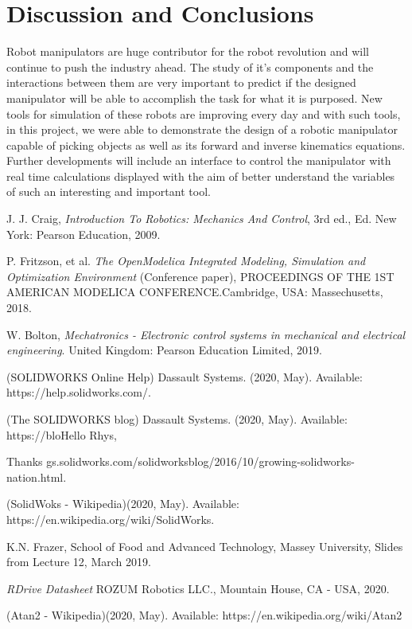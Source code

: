 \documentclass[transmag]{IEEEtran}
\begin{document}
\section{Discussion and Conclusions}

Robot manipulators are huge contributor for the robot revolution and will continue to push the industry ahead. The study of it's components and the interactions between them are very important to predict if the designed manipulator will be able to accomplish the task for what it is purposed. New tools for simulation of these robots are improving every day and with such tools, in this project, we were able to demonstrate the design of a robotic manipulator capable of picking objects as well as its forward and inverse kinematics equations. Further developments will include an interface to control the manipulator with real time calculations displayed with the aim of better understand the variables of such an interesting and important tool.


\clearpage
\newpage

\begin{thebibliography}{00}
 J. J. Craig, \emph{Introduction To Robotics: Mechanics And Control}, 3rd ed., Ed. New York: Pearson Education, 2009.

 P. Fritzson, et al. \emph{The OpenModelica Integrated Modeling, Simulation and Optimization Environment} (Conference paper), PROCEEDINGS OF THE 1ST AMERICAN MODELICA CONFERENCE$. $Cambridge, USA: Massechusetts, 2018.

 W. Bolton, \emph{Mechatronics - Electronic control systems in mechanical and electrical engineering}. United Kingdom: Pearson Education Limited, 2019.

 (SOLIDWORKS Online Help) Dassault Systems. (2020, May).  Available: https://help.solidworks.com/.

 (The SOLIDWORKS blog) Dassault Systems. (2020, May).  Available: https://bloHello Rhys,

Thanks gs.solidworks.com/solidworksblog/2016/10/growing-solidworks-nation.html.

 (SolidWoks - Wikipedia)(2020, May). Available: https://en.wikipedia.org/wiki/SolidWorks. 

 K.N. Frazer, School of Food and Advanced Technology, Massey University, Slides from Lecture 12, March 2019.

 \emph{RDrive Datasheet} ROZUM Robotics LLC., Mountain House, CA - USA, 2020.

 (Atan2 - Wikipedia)(2020, May). Available: https://en.wikipedia.org/wiki/Atan2
\end{thebibliography}



\clearpage
\newpage


\appendix
\label{appendix-A}




\end{document}
